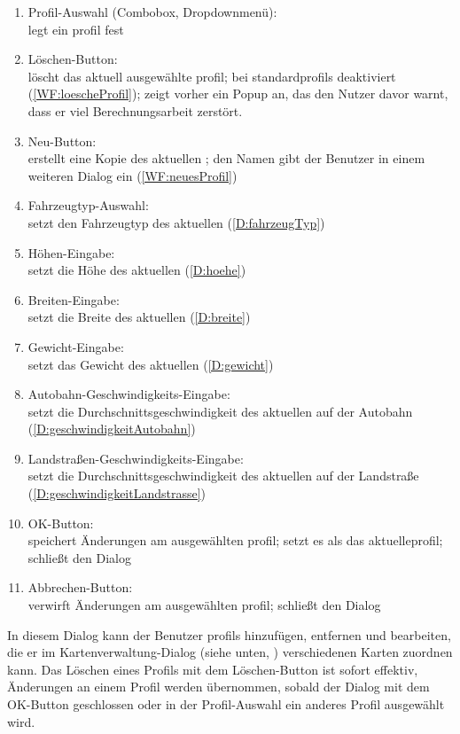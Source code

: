 \documentclass[a4paper, 11pt]{article}
\begin{document}
\begin{enumerate}
\item Profil-Auswahl (Combobox, Dropdownmenü):\\
legt ein \gls{profil} fest
\item Löschen-Button:\\
löscht das aktuell ausgewählte \gls{profil}; bei \glspl{standardprofil} deaktiviert (\ref{WF:loescheProfil}); zeigt vorher ein Popup an, das den Nutzer davor warnt, dass er viel Berechnungsarbeit zerstört. 
\item Neu-Button:\\
erstellt eine Kopie des aktuellen ; den Namen gibt der Benutzer in einem weiteren Dialog ein (\ref{WF:neuesProfil})
\item Fahrzeugtyp-Auswahl:\\
setzt den Fahrzeugtyp des aktuellen  (\ref{D:fahrzeugTyp})
\item Höhen-Eingabe:\\
setzt die Höhe des aktuellen  (\ref{D:hoehe})
\item Breiten-Eingabe:\\
setzt die Breite des aktuellen  (\ref{D:breite})
\item Gewicht-Eingabe:\\
setzt das Gewicht des aktuellen  (\ref{D:gewicht})
\item Autobahn-Geschwindigkeits-Eingabe:\\
setzt die Durchschnittsgeschwindigkeit des aktuellen  auf der Autobahn (\ref{D:geschwindigkeitAutobahn})
\item Landstraßen-Geschwindigkeits-Eingabe:\\
setzt die Durchschnittsgeschwindigkeit des aktuellen  auf der Landstraße (\ref{D:geschwindigkeitLandstrasse})
\item OK-Button:\\
speichert Änderungen am ausgewählten \gls{profil}; setzt es als das aktuelle\gls{profil}; schließt den Dialog
\item Abbrechen-Button:\\
verwirft Änderungen am ausgewählten \gls{profil}; schließt den Dialog
\end{enumerate}

In diesem Dialog kann der Benutzer \glspl{profil} hinzufügen, entfernen und bearbeiten, die er im Kartenverwaltung-Dialog (siehe unten, ) verschiedenen Karten zuordnen kann. Das Löschen eines Profils mit dem Löschen-Button ist sofort effektiv, Änderungen an einem Profil werden übernommen, sobald der Dialog mit dem OK-Button geschlossen oder in der Profil-Auswahl ein anderes Profil ausgewählt wird.
\end{document}
